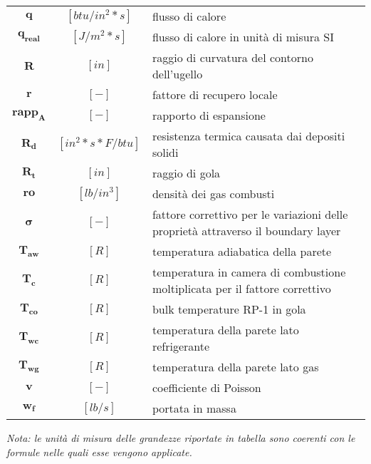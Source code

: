 \begin{multicols}{2}
{\begin{xltabular}{\linewidth}{cc>{\raggedright\arraybackslash}X}
		$\bm{q}$ & $[btu/in^2*s]$ & flusso di calore \\
		$\bm{q_{real}}$ & $[J/m^2*s]$ & flusso di calore in unità di misura SI \\
		$\bm{R}$ & $[in]$ & raggio di curvatura del contorno dell'ugello \\
		$\bm{r}$ & $[-]$ & fattore di recupero locale \\
		$\bm{rapp_A}$ & $[-]$ & rapporto di espansione \\
		$\bm{R_d}$ & $[in^2*s*F/btu]$ & resistenza termica causata dai depositi solidi \\
		$\bm{R_t}$ & $[in]$ & raggio di gola \\
		$\bm{ro}$ & $[lb/in^3]$ & densità dei gas combusti \\
		$\bm{\sigma}$ & $[-]$ & fattore correttivo per le variazioni delle proprietà attraverso  il boundary layer \\
		$\bm{T_{aw}}$ & $[R]$ & temperatura adiabatica della parete \\
		$\bm{T_c}$ & $[R]$ & temperatura in camera di combustione moltiplicata per il fattore correttivo \\
		$\bm{T_{co}}$ & $[R]$ & bulk temperature RP-1 in gola \\
		$\bm{T_{wc}}$ & $[R]$ & temperatura della parete lato refrigerante\\
		$\bm{T_{wg}}$ & $[R]$ & temperatura della parete lato gas \\
		$\bm{v}$ & $[-]$ & coefficiente di Poisson \\
		$\bm{w_f}$ & $[lb/s]$ & portata in massa
	\end{xltabular}
	\unskip
	\unpenalty
	\unpenalty}
	\unvbox\ltmcbox

\end{multicols}

\textit{Nota: le unità di misura delle grandezze riportate in tabella sono coerenti con le formule nelle quali esse vengono applicate.}